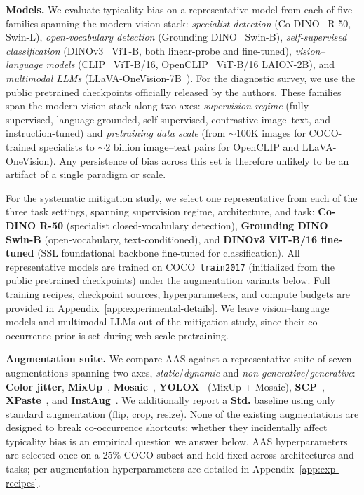 
\noindent\textbf{Models.} We evaluate typicality bias on a representative model from each of five families spanning the modern vision stack: \emph{specialist detection} (Co-DINO~\cite{zong2023detrs} R-50, Swin-L), \emph{open-vocabulary detection} (Grounding DINO~\cite{liu2024grounding} Swin-B), \emph{self-supervised classification} (DINOv3~\cite{simeoni2025dinov3} ViT-B, both linear-probe and fine-tuned), \emph{vision--language models} (CLIP~\cite{radford2021learning} ViT-B/16, OpenCLIP~\cite{cherti2023reproducible} ViT-B/16 LAION-2B), and \emph{multimodal LLMs} (LLaVA-OneVision-7B~\cite{li2024llava}). 
For the diagnostic survey, we use the public pretrained checkpoints officially released by the authors. These families span the modern vision stack along two axes: \emph{supervision regime} (fully supervised, language-grounded, self-supervised, contrastive image--text, and instruction-tuned) and \emph{pretraining data scale} (from $\sim 100$K images for COCO-trained specialists to $\sim 2$ billion image--text pairs for OpenCLIP and LLaVA-OneVision). Any persistence of bias across this set is therefore unlikely to be an artifact of a single paradigm or scale.

For the systematic mitigation study, we select one representative from each of the three task settings, spanning supervision regime, architecture, and task: \textbf{Co-DINO R-50} (specialist closed-vocabulary detection), \textbf{Grounding DINO Swin-B} (open-vocabulary, text-conditioned), and \textbf{DINOv3 ViT-B/16 fine-tuned} (SSL foundational backbone fine-tuned for classification). All representative models are trained on COCO~\texttt{train2017} (initialized from the public pretrained checkpoints) under the augmentation variants below. Full training recipes, checkpoint sources, hyperparameters, and compute budgets are provided in Appendix~\ref{app:experimental-details}. We leave vision--language models and multimodal LLMs out of the mitigation study, since their co-occurrence prior is set during web-scale pretraining.

\noindent\textbf{Augmentation suite.}
We compare AAS against a representative suite of seven augmentations
spanning two axes, \emph{static}/\emph{dynamic} and \emph{non-generative}/\emph{generative}: \textbf{Color jitter}, \textbf{MixUp}~\cite{zhang2017mixup}, \textbf{Mosaic}~\cite{bochkovskiy2020yolov4}, \textbf{YOLOX}~\cite{ge2021yolox} (MixUp + Mosaic), \textbf{SCP}~\cite{ghiasi2021simple}, \textbf{XPaste}~\cite{zhao2023x}, and \textbf{InstAug}~\cite{kupyn2024dataset}. We additionally report a \textbf{Std.} baseline using only standard augmentation (flip, crop, resize). None of the existing augmentations are designed to break co-occurrence shortcuts; whether they incidentally affect typicality bias is an empirical question we answer below. AAS hyperparameters are selected once on a $25\%$ COCO subset and held fixed across architectures and tasks; per-augmentation hyperparameters are detailed in Appendix~\ref{app:exp-recipes}.

